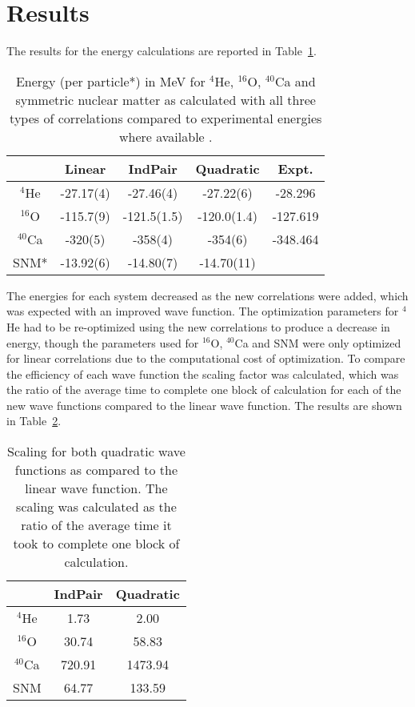 \documentclass[aps,prl,reprint,superscriptaddress]{revtex4-1}
\begin{document}
\section{Results}
The results for the energy calculations are reported in Table~\ref{tab:results}. 
\begin{table}[h!]
   \centering
   \caption{Energy (per particle*) in MeV for $^4$He, $^{16}$O, $^{40}$Ca and symmetric nuclear matter as calculated with all three types of correlations compared to experimental energies where available \cite{wang2012}.}
   \label{tab:results}
   \begin{tabular}{ccccc}
      \hline \hline
       & Linear & IndPair & Quadratic & Expt.\\
      \hline
      $^4$He & -27.17(4) & -27.46(4) & -27.22(6) & -28.296\\
      $^{16}$O & -115.7(9) & -121.5(1.5) & -120.0(1.4) & -127.619\\
      $^{40}$Ca & -320(5) & -358(4) & -354(6) & -348.464\\
      SNM* & -13.92(6) & -14.80(7) & -14.70(11) & \\
      \hline \hline
   \end{tabular}
\end{table}
The energies for each system decreased as the new correlations were added, which was expected with an improved wave function. The optimization parameters for $^4$He had to be re-optimized using the new correlations to produce a decrease in energy, though the parameters used for $^{16}$O, $^{40}$Ca and SNM were only optimized for linear correlations due to the computational cost of optimization. To compare the efficiency of each wave function the scaling factor was calculated, which was the ratio of the average time to complete one block of calculation for each of the new wave functions compared to the linear wave function. The results are shown in Table~\ref{tab:scaling}.
\begin{table}[h!]
   \centering
   \caption{Scaling for both quadratic wave functions as compared to the linear wave function. The scaling was calculated as the ratio of the average time it took to complete one block of calculation.}
   \label{tab:scaling}
   \begin{tabular}{ccc}
      \hline \hline
       & IndPair & Quadratic\\
      \hline
      $^4$He & 1.73 & 2.00\\
      $^{16}$O & 30.74 & 58.83\\
      $^{40}$Ca & 720.91 & 1473.94\\
      SNM & 64.77 & 133.59\\
      \hline \hline
   \end{tabular}
\end{table}
\end{document}
